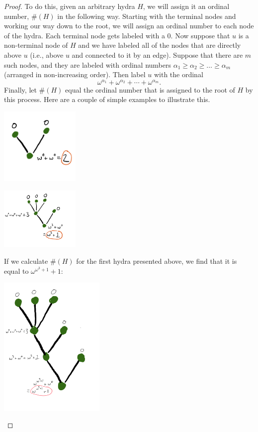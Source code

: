 \documentclass[a4paper]{memoir}
\theoremstyle{definition}
\begin{document}
\begin{proof}
  To do this, given an arbitrary hydra $H$, we will assign it an ordinal number, $\#(H)$ in 
  the following way. Starting with the terminal nodes and working our way down to the root, we 
  will assign an ordinal number to each node of the hydra. Each terminal node gets labeled with a $0$. 
  Now suppose that $u$ is a non-terminal node of $H$ and we have labeled all of the nodes 
  that are directly above $u$ (i.e., above $u$ and connected to it by an edge). Suppose that 
  there are $m$ such nodes, and they are labeled with ordinal numbers 
  $\alpha_1 \geq \alpha_2 \geq \ldots \geq \alpha_m$ (arranged in non-increasing order). Then label 
  $u$ with the ordinal 
  \[
    \omega^{\alpha_1} + \omega^{\alpha_2} + \cdots + \omega^{\alpha_m}.
  \]
  Finally, let $\#(H)$ equal the ordinal number that is assigned to the root of $H$ by this process.
  Here are a couple of simple examples to illustrate this.
  \begin{center}
    \includegraphics[width=1.5in]{Hydra9}
  \end{center}
  \begin{center}
    \includegraphics[width=1.5in]{Hydra10}
  \end{center}
  If we calculate $\#(H)$ for the first hydra presented above, we find that it is equal to 
  $\omega^{\omega^3 + 1} + 1$:
  \begin{center}
    \includegraphics[width=2in]{Hydra1N}

\end{center}
\end{proof}
\end{document}
